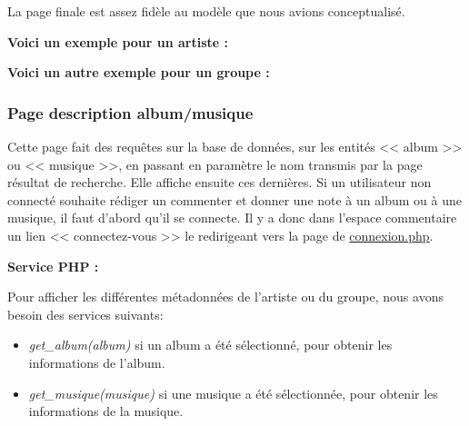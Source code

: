 
         \newpage

            \begin{paragraphe}
                La page finale est assez fidèle au modèle que nous avions conceptualisé.
            \end{paragraphe}

            \begin{paragraphe}
                \textbf{Voici un exemple pour un artiste :}
            \end{paragraphe}
            

            \begin{paragraphe}
                \textbf{Voici un autre exemple pour un groupe :}
            \end{paragraphe}
            

        \clearpage

		\subsubsection{Page description album/musique}

			\begin{paragraphe}
                Cette page fait des requêtes sur la base de données, sur les entités << album >> ou << musique >>,
                 en passant en paramètre le nom transmis par la page résultat de recherche. Elle affiche ensuite ces dernières.
				Si un utilisateur non connecté souhaite rédiger un commenter et donner une note à un album ou à une musique,
				 il faut d'abord qu'il se connecte. Il y a donc dans l'espace commentaire un lien << connectez-vous >> le redirigeant vers la page de \underline{connexion.php}.
			\end{paragraphe}

           \begin{paragraphe}
                \textbf{Service PHP :}
            \end{paragraphe}

            \begin{paragraphe}
                Pour afficher les différentes métadonnées de l'artiste ou du groupe, nous avons besoin des services suivants:
                \begin{itemize}
                        \item \emph{get\_album(album)} si un album a été sélectionné, pour obtenir les informations de l'album.
                        \item \emph{get\_musique(musique)} si une musique a été sélectionnée, pour obtenir les informations de la musique.
                \end{itemize}
            \end{paragraphe}

